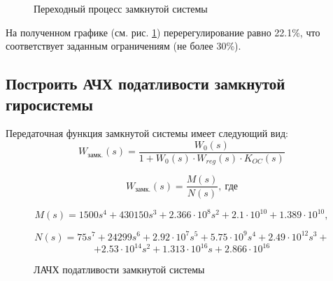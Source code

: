 \documentclass[main.tex]{subfiles}
\begin{document}
\begin{figure}[h]
    \caption{Переходный процесс замкнутой системы}
    \label{fig:p7_pp_corrected}
\end{figure}

На полученном графике (см. рис. \ref{fig:p7_pp_corrected}) перерегулирование равно 22.1\%, что соответствует заданным
ограничениям (не более 30\%).

\subsection{Построить АЧХ податливости замкнутой гиросистемы}
Передаточная функция замкнутой системы имеет следующий вид:
 \[ W_\text{замк.}(s) = \frac{W_0(s)}{1 + W_0(s)\cdot W_{reg}(s)\cdot K_{OC}(s)} \]

\[ W_\text{замк.}(s) = \frac{M(s)}{N(s)},\ \text{где} \]
    
\[ M(s) = 1500s^4 + 430150s^3 + 2.366 \cdot 10^{8}s^2 + 2.1 \cdot 10^{10} + 1.389 \cdot 10^{10}, \]

 \[ N(s) = 75s^7 + 24299s^6 + 2.92 \cdot 10^{7}s^5 + 5.75 \cdot 10^{9}s^4 + 2.49 \cdot 10^{12}s^3 + \]
 \[+ 2.53 \cdot 10^{14}s^2 + 1.313 \cdot 10^{16}s + 2.866 \cdot 10^{16} \]

\begin{figure}[h]
    \caption{ЛАЧХ податливости замкнутой системы}
    \label{fig:p8_achx}
\end{figure}
\end{document}
